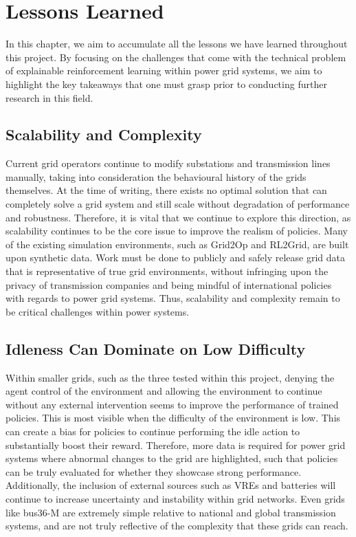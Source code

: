 \chapter{Lessons Learned}
\label{ch:lessonslearned}

In this chapter, we aim to accumulate all the lessons we have learned throughout this project. By focusing on the challenges that come with the technical problem of explainable reinforcement learning within power grid systems, we aim to highlight the key takeaways that one must grasp prior to conducting further research in this field. 

\section{Scalability and Complexity}

Current grid operators continue to modify substations and transmission lines manually, taking into consideration the behavioural history of the grids themselves. At the time of writing, there exists no optimal solution that can completely solve a grid system and still scale without degradation of performance and robustness. Therefore, it is vital that we continue to explore this direction, as scalability continues to be the core issue to improve the realism of policies. Many of the existing simulation environments, such as Grid2Op and RL2Grid, are built upon synthetic data. Work must be done to publicly and safely release grid data that is representative of true grid environments, without infringing upon the privacy of transmission companies and being mindful of international policies with regards to power grid systems. Thus, scalability and complexity remain to be critical challenges within power systems.

\section{Idleness Can Dominate on Low Difficulty}


Within smaller grids, such as the three tested within this project, denying the agent control of the environment and allowing the environment to continue without any external intervention seems to improve the performance of trained policies. This is most visible when the difficulty of the environment is low. This can create a bias for policies to continue performing the idle action to substantially boost their reward. Therefore, more data is required for power grid systems where abnormal changes to the grid are highlighted, such that policies can be truly evaluated for whether they showcase strong performance. Additionally, the inclusion of external sources such as VREs and batteries will continue to increase uncertainty and instability within grid networks. Even grids like bus36-M are extremely simple relative to national and global transmission systems, and are not truly reflective of the complexity that these grids can reach.

